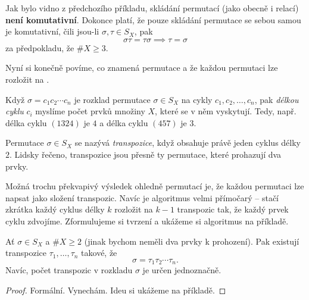 \begin{warning}
 Jak bylo vidno z předchozího příkladu, skládání permutací (jako obecně i
 relací) \textbf{není komutativní}. Dokonce platí, že pouze skládání permutace
 se sebou samou je komutativní, čili jsou-li $\sigma,\tau \in S_X$, pak
 \[
  \sigma\tau = \tau\sigma \implies \tau = \sigma
 \]
 za předpokladu, že $\# X \geq 3$.
\end{warning}

Nyní si konečně povíme, co znamená  permutace a že každou permutaci lze
rozložit na .

Když $\sigma = c_1c_2\cdots c_n$ je rozklad permutace $\sigma \in S_X$ na cykly
$c_1,c_2,\ldots,c_n$, pak \emph{délkou cyklu} $c_i$ myslíme počet prvků množiny
$X$, které se v něm vyskytují. Tedy, např. délka cyklu $(1324)$ je $4$ a délka
cyklu $(457)$ je $3$.

\begin{definition}[Transpozice]
\label{def:transpozice}
 Permutace $\sigma \in S_X$ se nazývá \emph{transpozice}, když obsahuje právě
 jeden cyklus délky $2$. Lidsky řečeno, transpozice jsou přesně ty permutace,
 které prohazují dva prvky.
\end{definition}

Možná trochu překvapivý výsledek ohledně permutací je, že každou permutaci lze
napsat jako složení transpozic. Navíc je algoritmus velmi přímočarý -- stačí
zkrátka každý cyklus délky $k$ rozložit na $k - 1$ transpozic tak, že každý
 prvek cyklu zdvojíme. Zformulujeme si tvrzení a ukážeme si
algoritmus na příkladě.

\begin{claim}
 Ať $\sigma \in S_X$ a $\# X \geq 2$ (jinak bychom neměli dva prvky k
 prohození). Pak existují transpozice $\tau_1,\ldots,\tau_n$ takové, že
 \[
  \sigma = \tau_1\tau_2\cdots \tau_n.
 \]
 Navíc, počet transpozic v rozkladu $\sigma$ je určen jednoznačně.
\end{claim}
\begin{proof}
 Formální. Vynechám. Ideu si ukážeme na příkladě.
\end{proof}

